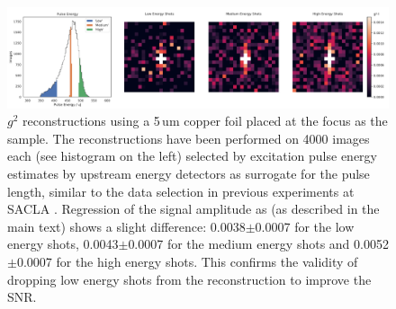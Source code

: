 \begin{figure}[h!]
	\centering
	\includegraphics[width=\linewidth]{images/energy_binned.pdf}
	\caption[Excitation energy binned reconstruction]{$g^2$ reconstructions using a 5\,um copper foil placed at the focus as the sample. The reconstructions have been performed on 4000 images each (see histogram on the left)  selected by excitation pulse energy estimates by upstream energy detectors as surrogate for the pulse length, similar to the data selection in previous experiments at SACLA \cite{inoue2019}. Regression of the signal amplitude as (as described in the main text) shows a slight difference: 0.0038$\pm$0.0007 for the low energy shots, 0.0043$\pm$0.0007 for the medium energy shots and 0.0052$\pm$0.0007 for the high energy shots. This confirms the validity of dropping low energy shots from the reconstruction to improve the SNR.}
	\label{fig:energy_binned}
\end{figure}


